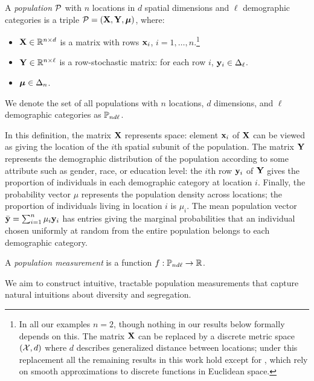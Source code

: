 \begin{dfn} \label{def:population}
    A \emph{population} $\mathcal{P}$ with $n$ locations in $d$ spatial dimensions and $\ell$ demographic categories is a triple $\mathcal{P} = (\mathbf{X}, \mathbf{Y}, \boldsymbol{\mu})$, where: 
    \begin{itemize}
      \item $\mathbf{X} \in \mathbb{R}^{n\times d}$ is a matrix with rows $\mathbf{x}_i$, $i = 1, \ldots, n$.\footnote{In all our examples $n = 2$, though nothing in our results below formally depends on this. The matrix $\mathbf{X}$ can be replaced by a discrete metric space $(\mathcal{X}, d)$ where $d$ describes generalized distance between locations; under this replacement all the remaining results in this work hold except for , which rely on smooth approximations to discrete functions in Euclidean space.} 
      \item $\mathbf{Y} \in \mathbb{R}^{n \times \ell}$ is a row-stochastic matrix: for each row $i$, $\mathbf{y}_i \in \Delta_{\ell}$.
      \item $\boldsymbol{\mu} \in \Delta_{n}$.   
    \end{itemize}
    We denote the set of all populations with $n$ locations, $d$ dimensions, and $\ell$ demographic categories as $\mathbb{P}_{nd\ell}$. 
\end{dfn}
In this definition, the matrix $\mathbf{X}$ represents space: element $\mathbf{x}_i$ of $\mathbf{X}$ can be viewed as giving the location of the $i$th spatial subunit of the population. 
The matrix $\mathbf{Y}$ represents the demographic distribution of the population according to some attribute such as gender, race, or education level: the $i$th row $\mathbf{y}_i$ of $\mathbf{Y}$ gives the proportion of individuals in each demographic category at location $i$.
Finally, the probability vector $\mu$ represents the population density across locations; the proportion of individuals living in location $i$ is $\mu_i$. 
The mean population vector $\bar{\mathbf{y}} = \sum_{i = 1}^n \mu_i \mathbf{y}_i$ has entries giving the marginal probabilities that an individual chosen uniformly at random from the entire population belongs to each demographic category. 
\begin{dfn} \label{def:population-measurement}
  A \emph{population measurement} is a function $f: \mathbb{P}_{nd\ell} \rightarrow \mathbb{R}$.
\end{dfn}
We aim to construct intuitive, tractable population measurements that capture natural intuitions about diversity and segregation.

